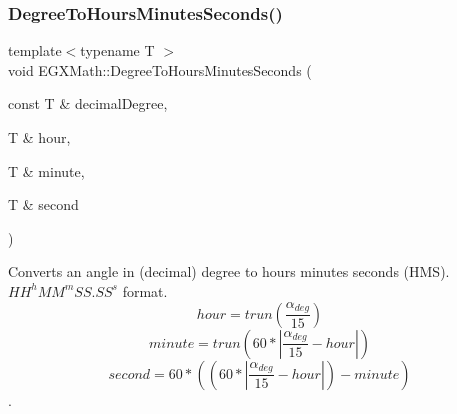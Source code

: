 \subsubsection{\texorpdfstring{Degree\+To\+Hours\+Minutes\+Seconds()}{DegreeToHoursMinutesSeconds()}}
{\footnotesize\ttfamily template$<$typename T $>$ \\
void E\+G\+X\+Math\+::\+Degree\+To\+Hours\+Minutes\+Seconds (\begin{DoxyParamCaption}\item[{const T \&}]{decimal\+Degree,  }\item[{T \&}]{hour,  }\item[{T \&}]{minute,  }\item[{T \&}]{second }\end{DoxyParamCaption})}



Converts an angle in (decimal) degree to hours minutes seconds (H\+MS). ${HH}^{h}{MM}^{m}{SS.SS}^{s}$ format. \[hour=trun(\frac{\alpha_{deg}}{15})\] \[minute=trun(60 * |\frac{\alpha_{deg}}{15} - hour|)\] \[second=60 * ((60 * |\frac{\alpha_{deg}}{15} - hour|)-minute)\]. 

